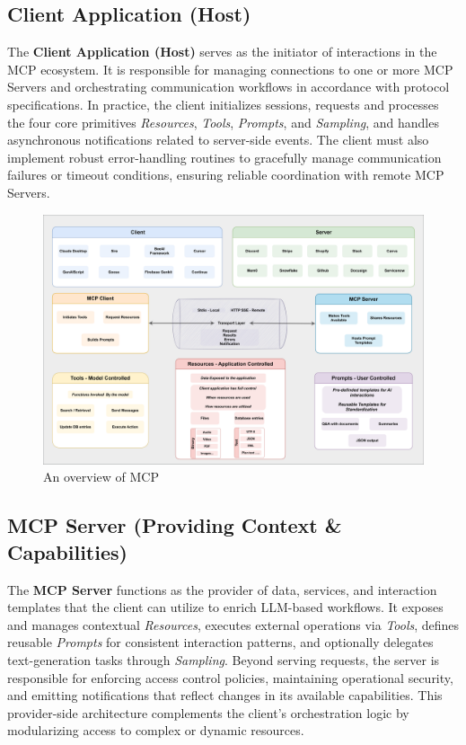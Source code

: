 \documentclass{article}
\begin{document}
\subsection{Client Application (Host)}
The \textbf{Client Application (Host)} serves as the initiator of interactions in the MCP ecosystem. It is responsible for managing connections to one or more MCP Servers and orchestrating communication workflows in accordance with protocol specifications. In practice, the client initializes sessions, requests and processes the four core primitives \textit{Resources}, \textit{Tools}, \textit{Prompts}, and \textit{Sampling}, and handles asynchronous notifications related to server-side events. The client must also implement robust error-handling routines to gracefully manage communication failures or timeout conditions, ensuring reliable coordination with remote MCP Servers.


\begin{figure}
    \centering
    \includegraphics[width=\linewidth]{mcp.png}
    \caption{An overview of MCP~\cite{singh2025mcp}}
    \label{fig:MCP}
\end{figure}

\subsection{MCP Server (Providing Context \& Capabilities)}
The \textbf{MCP Server} functions as the provider of data, services, and interaction templates that the client can utilize to enrich LLM-based workflows. It exposes and manages contextual \textit{Resources}, executes external operations via \textit{Tools}, defines reusable \textit{Prompts} for consistent interaction patterns, and optionally delegates text-generation tasks through \textit{Sampling}. Beyond serving requests, the server is responsible for enforcing access control policies, maintaining operational security, and emitting notifications that reflect changes in its available capabilities. This provider-side architecture complements the client’s orchestration logic by modularizing access to complex or dynamic resources.
\end{document}
